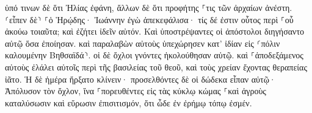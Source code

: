 \documentclass{openreader}
\begin{document}
ὑπό τινων δὲ ὅτι Ἠλίας ἐφάνη, ἄλλων δὲ ὅτι προφήτης ⸀τις τῶν ἀρχαίων ἀνέστη. 
⸂εἶπεν δὲ⸃ ⸀ὁ Ἡρῴδης· Ἰωάννην ἐγὼ ἀπεκεφάλισα· τίς δέ ἐστιν οὗτος περὶ ⸀οὗ ἀκούω τοιαῦτα; καὶ ἐζήτει ἰδεῖν αὐτόν. 
Καὶ ὑποστρέψαντες οἱ ἀπόστολοι διηγήσαντο αὐτῷ ὅσα ἐποίησαν. καὶ παραλαβὼν αὐτοὺς ὑπεχώρησεν κατ’ ἰδίαν εἰς ⸂πόλιν καλουμένην Βηθσαϊδά⸃. 
οἱ δὲ ὄχλοι γνόντες ἠκολούθησαν αὐτῷ. καὶ ⸀ἀποδεξάμενος αὐτοὺς ἐλάλει αὐτοῖς περὶ τῆς βασιλείας τοῦ θεοῦ, καὶ τοὺς χρείαν ἔχοντας θεραπείας ἰᾶτο. 
Ἡ δὲ ἡμέρα ἤρξατο κλίνειν· προσελθόντες δὲ οἱ δώδεκα εἶπαν αὐτῷ· Ἀπόλυσον τὸν ὄχλον, ἵνα ⸀πορευθέντες εἰς τὰς κύκλῳ κώμας ⸀καὶ ἀγροὺς καταλύσωσιν καὶ εὕρωσιν ἐπισιτισμόν, ὅτι ὧδε ἐν ἐρήμῳ τόπῳ ἐσμέν. 
\end{document}
